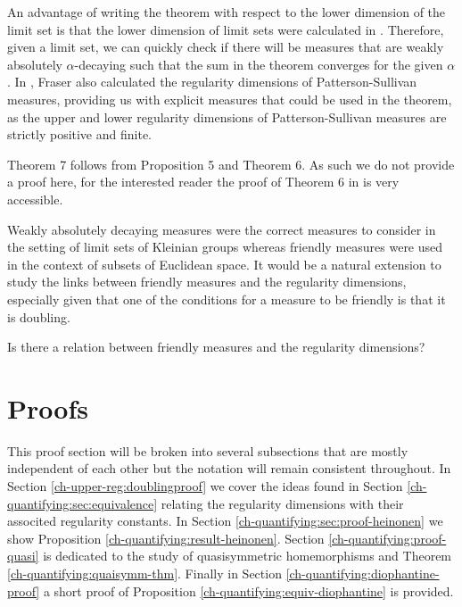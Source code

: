 An advantage of writing the theorem with respect to the lower dimension of the limit set is that the lower dimension of limit sets were calculated in \cite{fraser2}. Therefore, given a limit set, we can quickly check if there will be measures that are weakly absolutely $\alpha$-decaying such that the sum in the theorem converges for the given $\alpha$. In \cite{fraser2}, Fraser also calculated the regularity dimensions of Patterson-Sullivan measures, providing us with explicit measures that could be used in the theorem, as the upper and lower regularity dimensions of Patterson-Sullivan measures are strictly positive and finite. 

Theorem 7 follows from Proposition 5 and Theorem 6. As such we do not provide a proof here, for the interested reader the proof of Theorem 6 in \cite{beres-sanju-al} is very accessible.

Weakly absolutely decaying measures were the correct measures to consider in the setting of limit sets of Kleinian groups whereas friendly measures were used in the context of subsets of Euclidean space. It would be a natural extension to study the links between friendly measures and the regularity dimensions, especially given that one of the conditions for a measure to be friendly is that it is doubling.  

\begin{question}
Is there a relation between friendly measures and the regularity dimensions?
\end{question}



\section{Proofs}


This proof section will be broken into several subsections that are mostly independent of each other but the notation will remain consistent throughout. In Section \ref{ch-upper-reg:doublingproof} we cover the ideas found in Section \ref{ch-quantifying:sec:equivalence} relating the regularity dimensions with their associted regularity constants. In Section \ref{ch-quantifying:sec:proof-heinonen} we show Proposition \ref{ch-quantifying:result-heinonen}. Section \ref{ch-quantifying:proof-quasi} is dedicated to the study of quasisymmetric homemorphisms and Theorem \ref{ch-quantifying:quaisymm-thm}. Finally in Section \ref{ch-quantifying:diophantine-proof} a short proof of Proposition \ref{ch-quantifying:equiv-diophantine} is provided.


